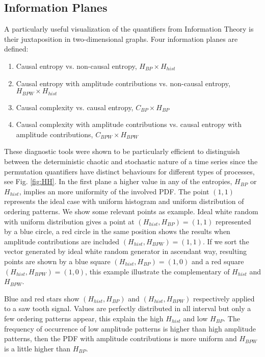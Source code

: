 \subsection{Information Planes}

A particularly useful visualization of the quantifiers from Information Theory is their juxtaposition in two-dimensional graphs.
Four information planes are defined:
\begin{enumerate}
	\item Causal entropy vs. non-causal entropy, $H_{BP} \times H_{hist}$
	\item Causal entropy with amplitude contributions vs. non-causal entropy, $H_{BPW} \times H_{hist}$
	\item Causal complexity vs. causal entropy, $C_{BP} \times H_{BP}$
	\item Causal complexity with amplitude contributions vs. causal entropy with amplitude contributions, $C_{BPW} \times H_{BPW}$
\end{enumerate}

These diagnostic tools were shown to be particularly efficient to distinguish between the deterministic chaotic and stochastic nature of a time series since the permutation quantifiers have distinct behaviours for different types of processes, see Fig. \ref{fig:HH}.
In the first plane a higher value in any of the entropies, $H_{BP}$ or $H_{hist}$, implies an more uniformity of the involved PDF.
The point $(1,1)$ represents the ideal case with uniform histogram and uniform distribution of ordering patterns.
We show some relevant points as example.
Ideal white random with uniform distribution gives a point at $(H_{hist}, H_{BP})=(1, 1)$ represented by a blue circle, a red circle in the same position shows the results when amplitude contributions are included $(H_{hist}, H_{BPW})=(1, 1)$.
If we sort the vector generated by ideal white random generator in ascendant way, resulting points are shown by a blue square $(H_{hist}, H_{BP})=(1, 0)$ and a red square $(H_{hist}, H_{BPW})=(1, 0)$, this example illustrate the complementary of $H_{hist}$ and $H_{BPW}$.

Blue and red stars show $(H_{hist}, H_{BP})$ and $(H_{hist}, H_{BPW})$ respectively applied to a saw tooth signal.
Values are perfectly distributed in all interval but only a few ordering patterns appear, this explain the high $H_{hist}$ and low $H_{BP}$.
The frequency of occurrence of low amplitude patterns is higher than high amplitude patterns, then the PDF with amplitude contributions is more uniform and $H_{BPW}$ is a little higher than $H_{BP}$.

